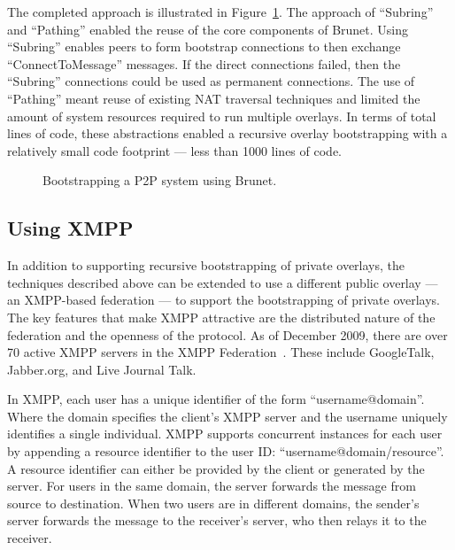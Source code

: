 The completed approach is illustrated in Figure~\ref{fig:bootstrap_brunet}.
The approach of ``Subring'' and ``Pathing'' enabled the reuse of the core
components of Brunet.  Using ``Subring'' enables peers to form bootstrap
connections to then exchange ``ConnectToMessage'' messages.  If the direct
connections failed, then the ``Subring'' connections could be used as permanent
connections.  The use of ``Pathing'' meant reuse of existing NAT traversal
techniques and limited the amount of system resources required to run multiple
overlays.  In terms of total lines of code, these abstractions enabled a
recursive overlay bootstrapping with a relatively small code footprint --- less
than 1000 lines of code.

\begin{center}
\begin{figure}
\caption{Bootstrapping a P2P system using Brunet.}
\label{fig:bootstrap_brunet}
\end{figure}
\end{center}

\subsection{Using XMPP}
\label{bs:xmpp_bootstrapping}

In addition to supporting recursive bootstrapping of private overlays, the
techniques described above can be extended to use a different public overlay
--- an XMPP-based federation --- to support the bootstrapping of private
overlays.  The key features that make XMPP attractive are the distributed
nature of the federation and the openness of the protocol.  As of December
2009, there are over 70 active XMPP servers in the XMPP
Federation~\cite{xmpp_servers}.  These include GoogleTalk, Jabber.org, and Live
Journal Talk.

In XMPP, each user has a unique identifier of the form ``username@domain''.
Where the domain specifies the client's XMPP server and the username uniquely
identifies a single individual.  XMPP supports concurrent instances for each
user by appending a resource identifier to the user ID:
``username@domain/resource''.  A resource identifier can either be provided by
the client or generated by the server.  For users in the same domain, the
server forwards the message from source to destination.  When two users are in
different domains, the sender's server forwards the message to the receiver's
server, who then relays it to the receiver.

